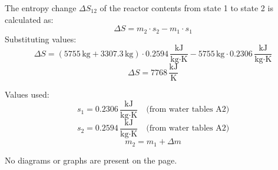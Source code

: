 The entropy change \( \Delta S_{12} \) of the reactor contents from state 1 to state 2 is calculated as:  
\[
\Delta S = m_2 \cdot s_2 - m_1 \cdot s_1
\]  
Substituting values:  
\[
\Delta S = \left( 5755 \, \text{kg} + 3307.3 \, \text{kg} \right) \cdot 0.2594 \, \frac{\text{kJ}}{\text{kg·K}} - 5755 \, \text{kg} \cdot 0.2306 \, \frac{\text{kJ}}{\text{kg·K}}
\]  
\[
\Delta S = 7768 \, \frac{\text{kJ}}{\text{K}}
\]  

Values used:  
\[
s_1 = 0.2306 \, \frac{\text{kJ}}{\text{kg·K}} \quad \text{(from water tables A2)}
\]  
\[
s_2 = 0.2594 \, \frac{\text{kJ}}{\text{kg·K}} \quad \text{(from water tables A2)}
\]  
\[
m_2 = m_1 + \Delta m
\]  

No diagrams or graphs are present on the page.